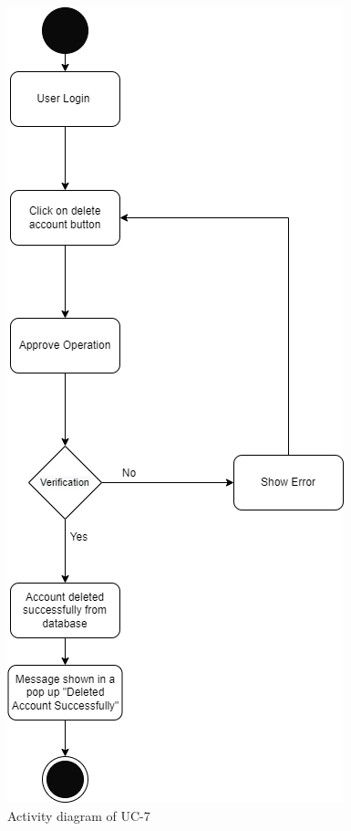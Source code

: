 \begin{figure}[H]
    \centering
    \includegraphics[scale=0.7]{./diagrams/Activity Diagram/ad-07.png}
    \caption{Activity diagram of UC-7}
    \label{fig:act-07}

\end{figure}


